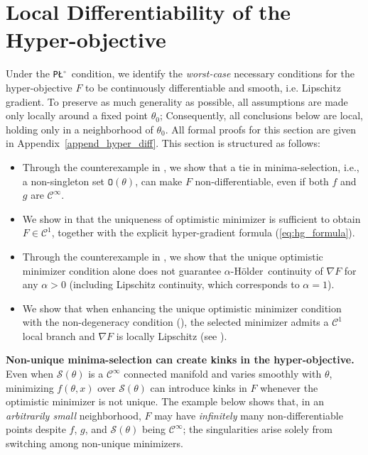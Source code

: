 \documentclass{article}
\theoremstyle{normaltheorem}
\newcommand{\hyperobjective}{F}
\newcommand{\PLcirc}{\texttt{P\L$^\circ$}}
\newcommand{\calS}{\mathcal{S}}
\newcommand{\holder}{{H\"older}}
\newcommand{\selectedminimizerset}{{\texttt{O}}}
\newcommand{\minimaselection}{{minima-selection}\xspace}
\begin{document}
\section{Local Differentiability of the Hyper-objective}\label{sec:hyp_diff}
Under the \PLcirc\ condition, we identify the \emph{worst-case} necessary conditions for the hyper-objective $\hyperobjective$ to be continuously differentiable and smooth, i.e. Lipschitz gradient.
To preserve as much generality as possible, all assumptions are made only locally around a fixed point $\theta_0$; Consequently, all conclusions below are local, holding only in a neighborhood of $\theta_0$.
All formal proofs for this section are given in Appendix~\ref{append_hyper_diff}.
This section is structured as follows:
\begin{itemize}[leftmargin=*]
    \item Through the counterexample in , we show that a tie in \minimaselection, i.e., a non-singleton set $\selectedminimizerset(\theta)$, can make $F$ non-differentiable, even if both $f$ and $g$ are $\mathcal{C}^\infty$.
    \item We show in  that the uniqueness of optimistic minimizer is sufficient to obtain $F\in\mathcal C^1$, together with the explicit hyper-gradient formula (\ref{eq:hg_formula}).
    \item Through the counterexample in , we show that the unique optimistic minimizer condition alone does not guarantee $\alpha$-\holder\ continuity of $\nabla F$ for any $\alpha>0$ (including Lipschitz continuity, which corresponds to $\alpha=1$).
    \item We show that when enhancing the unique optimistic minimizer condition with the non-degeneracy condition (), the selected minimizer admits a $\mathcal C^1$ local branch and $\nabla \hyperobjective$ is locally Lipschitz (see ).
\end{itemize}



\textbf{Non-unique minima-selection can create kinks in the hyper-objective.}
Even when $\calS(\theta)$ is a $\mathcal{C}^\infty$ connected manifold and varies smoothly with $\theta$, minimizing $f(\theta,x)$ over $\calS(\theta)$ can introduce kinks in $F$ whenever the optimistic minimizer is not unique.
The example below shows that, in an \emph{arbitrarily small} neighborhood, $F$ may have \emph{infinitely} many non-differentiable points despite $f$, $g$, and $\calS(\theta)$ being $\mathcal{C}^\infty$; the singularities arise solely from switching among non-unique minimizers.
\end{document}
